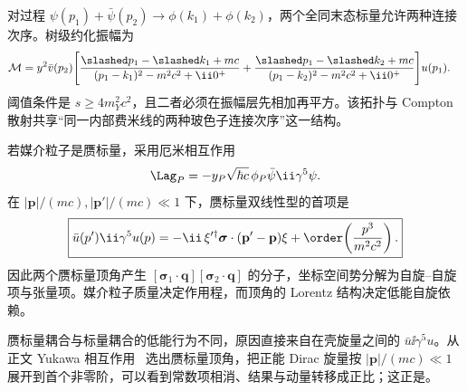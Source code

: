 对过程 $\psi(p_1)+\bar\psi(p_2)\to\phi(k_1)+\phi(k_2)$，两个全同末态标量允许两种连接次序。树级约化振幅为
\begin{align}
 \mathcal M
 =y^2\bar v(p_2)\Bigg[
 &\frac{\slashed p_1-\slashed k_1+mc}
 {(p_1-k_1)^2-m^2c^2+\ii0^+}
 +\frac{\slashed p_1-\slashed k_2+mc}
 {(p_1-k_2)^2-m^2c^2+\ii0^+}
 \Bigg]u(p_1).
 \label{eq:yukawa-annihilation-two-scalar-si-r10}
\end{align}
阈值条件是 $s\ge4m_Y^2c^2$，且二者必须在振幅层先相加再平方。该拓扑与 Compton 散射共享“同一内部费米线的两种玻色子连接次序”这一结构。


\begin{exbox}[赝标量耦合的低能自旋结构]
若媒介粒子是赝标量，采用厄米相互作用
\begin{equation}
 \Lag_P=-y_P\sqrt{\hbar c}\,\phi_P\bar\psi\ii\gamma^5\psi.
 \label{eq:pseudoscalar-yukawa-si-r10}
\end{equation}
在 $|\mathbf p|/(mc),|\mathbf p'|/(mc)\ll1$ 下，赝标量双线性型的首项是
\begin{equation}
 \boxed{
 \bar u(p')\ii\gamma^5u(p)
 =-\ii\,\xi'^\dagger
 \boldsymbol\sigma\cdot(\mathbf p'-\mathbf p)\xi
 +\order\!\left(\frac{p^3}{m^2c^2}\right).}
 \label{eq:pseudoscalar-NR-bilinear-si-r10}
\end{equation}
因此两个赝标量顶角产生 $[\boldsymbol\sigma_1\cdot\mathbf q][\boldsymbol\sigma_2\cdot\mathbf q]$ 的分子，坐标空间势分解为自旋--自旋项与张量项。媒介粒子质量决定作用程，而顶角的 Lorentz 结构决定低能自旋依赖。


\medskip

赝标量耦合与标量耦合的低能行为不同，原因直接来自在壳旋量之间的 $\bar u\ii\gamma^5u$。从正文 Yukawa 相互作用~ 选出赝标量顶角，把正能 Dirac 旋量按 $|\mathbf p|/(mc)\ll1$ 展开到首个非零阶，可以看到常数项相消、结果与动量转移成正比；这正是。


\end{exbox}
